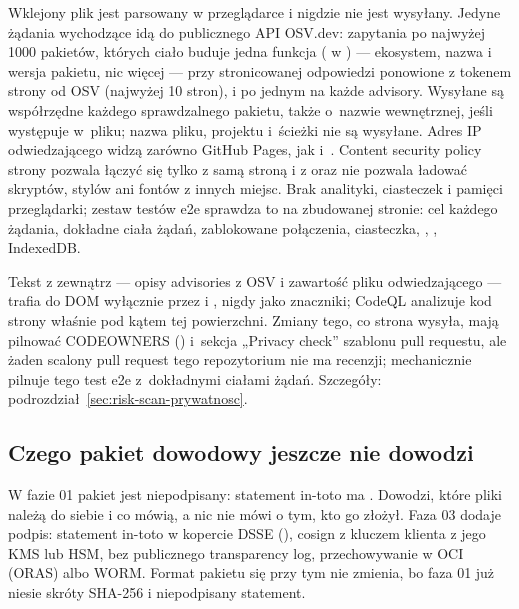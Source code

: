 Wklejony plik jest parsowany w przeglądarce i nigdzie nie jest wysyłany. Jedyne żądania
wychodzące idą do publicznego API OSV.dev: zapytania  po najwyżej
1000 pakietów, których ciało buduje jedna funkcja ( w
) --- ekosystem, nazwa i wersja pakietu, nic więcej --- przy
stronicowanej odpowiedzi ponowione z tokenem strony od OSV (najwyżej 10 stron), i po
jednym  na każde advisory. Wysyłane są współrzędne każdego sprawdzalnego
pakietu, także o~nazwie wewnętrznej, jeśli występuje w~pliku; nazwa pliku, projektu
i~ścieżki nie są wysyłane. Adres IP odwiedzającego widzą zarówno GitHub Pages, jak
i~. Content security policy strony pozwala łączyć się
tylko z samą stroną i z  oraz nie pozwala ładować skryptów, stylów
ani fontów z innych miejsc. Brak analityki, ciasteczek i pamięci przeglądarki; zestaw testów
e2e sprawdza to na zbudowanej stronie: cel każdego żądania, dokładne ciała żądań,
zablokowane połączenia, ciasteczka, , ,
IndexedDB.

Tekst z zewnątrz --- opisy advisories z OSV i zawartość pliku odwiedzającego --- trafia do
DOM wyłącznie przez  i , nigdy jako znaczniki;
CodeQL analizuje kod strony właśnie pod kątem tej powierzchni. Zmiany tego, co strona
wysyła, mają pilnować CODEOWNERS () i~sekcja „Privacy check” szablonu
pull requestu, ale żaden scalony pull request tego repozytorium nie ma recenzji;
mechanicznie pilnuje tego test e2e z~dokładnymi ciałami żądań. Szczegóły:
podrozdział~\ref{sec:risk-scan-prywatnosc}.


\subsection{Czego pakiet dowodowy jeszcze nie dowodzi}\label{sec:bezpieczenstwo-podpis}

W fazie 01 pakiet jest niepodpisany: statement in-toto ma .
Dowodzi, które pliki należą do siebie i co mówią, a nic nie mówi o tym, kto go złożył.
Faza 03 dodaje podpis: statement in-toto w kopercie DSSE (),
cosign z kluczem klienta z jego KMS lub HSM, bez publicznego transparency log,
przechowywanie w OCI (ORAS) albo WORM. Format pakietu się przy tym nie zmienia, bo faza 01
już niesie skróty SHA-256 i niepodpisany statement.

